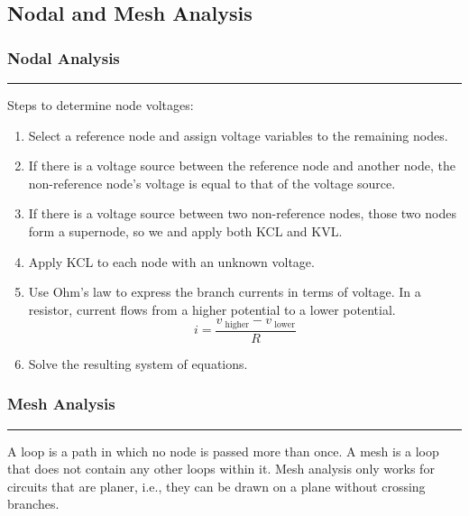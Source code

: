 \documentclass{article}
\begin{document}
    \pagebreak
    \begin{center}
        \subsection*{Nodal and Mesh Analysis}
    \end{center}

    \medskip
    \subsubsection*{Nodal Analysis}
    \vspace{-1em}
    \rule{\linewidth}{0.1mm}

    \vspace{.2em}\noindent
    Steps to determine node voltages:

    \begin{enumerate}[label=\arabic*.]
        \item Select a reference node and assign voltage variables to the remaining nodes.
        \item If there is a voltage source between the reference node and another node, the non-reference node's voltage is equal to that of the voltage source.
        \item If there is a voltage source between two non-reference nodes, those two nodes form a supernode, so we and apply both KCL and KVL\@.
        \item Apply KCL to each node with an unknown voltage.
        \item Use Ohm's law to express the branch currents in terms of voltage.
        In a resistor, current flows from a higher potential to a lower potential.
        \[
            i = \frac{v_{\text{ higher}} - v_{\text{ lower}}}{R}
        \]
        \item Solve the resulting system of equations.
    \end{enumerate}

    \smallskip
    \subsubsection*{Mesh Analysis}
    \vspace{-1em}
    \rule{\linewidth}{0.1mm}

    \smallskip\noindent
    A loop is a path in which no node is passed more than once.
    A mesh is a loop that does not contain any other loops within it.
    Mesh analysis only works for circuits that are planer, i.e., they can be drawn on a plane without crossing branches.
\end{document}
